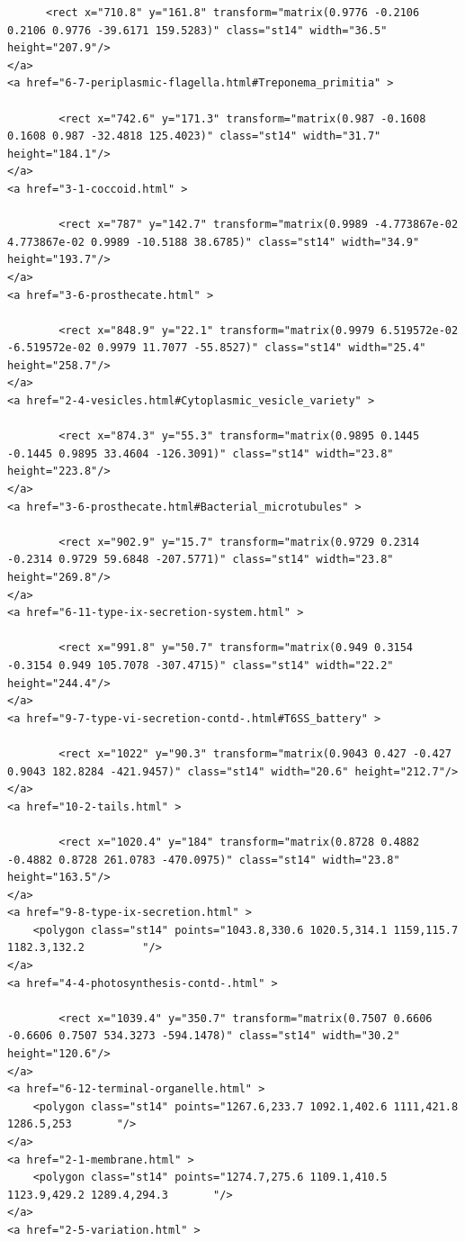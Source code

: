 \documentclass[]{tufte-book}
\begin{document}
\begin{verbatim}
      <rect x="710.8" y="161.8" transform="matrix(0.9776 -0.2106 0.2106 0.9776 -39.6171 159.5283)" class="st14" width="36.5" height="207.9"/>
</a>
<a href="6-7-periplasmic-flagella.html#Treponema_primitia" >

        <rect x="742.6" y="171.3" transform="matrix(0.987 -0.1608 0.1608 0.987 -32.4818 125.4023)" class="st14" width="31.7" height="184.1"/>
</a>
<a href="3-1-coccoid.html" >

        <rect x="787" y="142.7" transform="matrix(0.9989 -4.773867e-02 4.773867e-02 0.9989 -10.5188 38.6785)" class="st14" width="34.9" height="193.7"/>
</a>
<a href="3-6-prosthecate.html" >

        <rect x="848.9" y="22.1" transform="matrix(0.9979 6.519572e-02 -6.519572e-02 0.9979 11.7077 -55.8527)" class="st14" width="25.4" height="258.7"/>
</a>
<a href="2-4-vesicles.html#Cytoplasmic_vesicle_variety" >

        <rect x="874.3" y="55.3" transform="matrix(0.9895 0.1445 -0.1445 0.9895 33.4604 -126.3091)" class="st14" width="23.8" height="223.8"/>
</a>
<a href="3-6-prosthecate.html#Bacterial_microtubules" >

        <rect x="902.9" y="15.7" transform="matrix(0.9729 0.2314 -0.2314 0.9729 59.6848 -207.5771)" class="st14" width="23.8" height="269.8"/>
</a>
<a href="6-11-type-ix-secretion-system.html" >

        <rect x="991.8" y="50.7" transform="matrix(0.949 0.3154 -0.3154 0.949 105.7078 -307.4715)" class="st14" width="22.2" height="244.4"/>
</a>
<a href="9-7-type-vi-secretion-contd-.html#T6SS_battery" >

        <rect x="1022" y="90.3" transform="matrix(0.9043 0.427 -0.427 0.9043 182.8284 -421.9457)" class="st14" width="20.6" height="212.7"/>
</a>
<a href="10-2-tails.html" >

        <rect x="1020.4" y="184" transform="matrix(0.8728 0.4882 -0.4882 0.8728 261.0783 -470.0975)" class="st14" width="23.8" height="163.5"/>
</a>
<a href="9-8-type-ix-secretion.html" >
    <polygon class="st14" points="1043.8,330.6 1020.5,314.1 1159,115.7 1182.3,132.2         "/>
</a>
<a href="4-4-photosynthesis-contd-.html" >

        <rect x="1039.4" y="350.7" transform="matrix(0.7507 0.6606 -0.6606 0.7507 534.3273 -594.1478)" class="st14" width="30.2" height="120.6"/>
</a>
<a href="6-12-terminal-organelle.html" >
    <polygon class="st14" points="1267.6,233.7 1092.1,402.6 1111,421.8 1286.5,253       "/>
</a>
<a href="2-1-membrane.html" >
    <polygon class="st14" points="1274.7,275.6 1109.1,410.5 1123.9,429.2 1289.4,294.3       "/>
</a>
<a href="2-5-variation.html" >


\end{verbatim}
\end{document}
